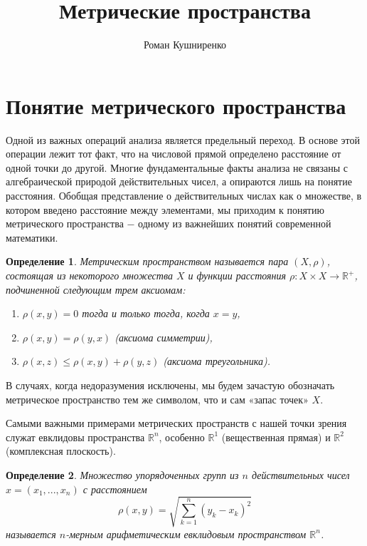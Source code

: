 \documentclass{article}
\title{Метрические пространства}
\author{Роман Кушниренко}
\newtheorem{definition}{Определение}[section]
\begin{document}

	\maketitle

	\section{Понятие метрического пространства}

Одной из важных операций анализа является предельный переход. В основе этой операции лежит тот факт, что на числовой прямой определено расстояние от одной точки до другой. Многие фундаментальные факты анализа не связаны с алгебраической природой действительных чисел, а опираются лишь на понятие расстояния. Обобщая представление о действительных числах как о множестве, в котором введено расстояние между элементами, мы приходим к понятию метрического пространства \(-\) одному из важнейших понятий современной математики.

\begin{definition}
Метрическим пространством называется пара \((X, \rho)\), состоящая из некоторого множества \(X\) и функции расстояния \(\rho : X \times X \to \mathbb{R^{+}}\), подчиненной следующим трем аксиомам:
\begin{enumerate}
    \item \(\rho(x, y) = 0\) тогда и только тогда, когда \(x = y\),
    \item \(\rho(x, y) = \rho(y, x)\) (аксиома симметрии),
    \item \(\rho(x, z) \leq \rho(x, y) + \rho(y, z)\) (аксиома треугольника).
\end{enumerate}
\end{definition}

В случаях, когда недоразумения исключены, мы будем зачастую обозначать метрическое пространство тем же символом, что и сам «запас точек» \(X\). \newline

Самыми важными примерами метрических пространств с нашей точки зрения служат евклидовы пространства \(\mathbb{R}^n\), особенно \(\mathbb{R}^1\) (вещественная прямая) и \(\mathbb{R}^2\) (комплексная плоскость).

\begin{definition}
Множество упорядоченных групп из \(n\) действительных чисел \(x = (x_1, ..., x_n)\) с расстоянием
\[
\rho(x, y) = \sqrt{\sum_{k = 1}^{n}(y_k - x_k)^2}
\]
называется \(n\)-мерным арифметическим евклидовым пространством \(\mathbb{R}^n\).
\end{definition}
\end{document}
